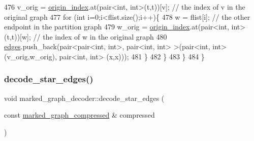 \begin{DoxyCode}
476       v\_orig = \hyperlink{classmarked__graph__decoder_aab3e2f6d4376ba96da32f25aa9ddd069}{origin\_index}.at(pair<int, int>(t,t))[v]; \textcolor{comment}{// the index of v in the original graph
       }
477       \textcolor{keywordflow}{for} (\textcolor{keywordtype}{int} i=0;i<flist.size();i++)\{
478         w = flist[i]; \textcolor{comment}{// the other endpoint in the partition graph}
479         w\_orig = \hyperlink{classmarked__graph__decoder_aab3e2f6d4376ba96da32f25aa9ddd069}{origin\_index}.at(pair<int, int>(t,t))[w]; \textcolor{comment}{// the index of w in the original
       graph}
480         \hyperlink{classmarked__graph__decoder_af9e75da0a495d9c3bdcd169e15e3261e}{edges}.push\_back(pair<pair<int, int>, pair<int, int> >(pair<int, int>(v\_orig,w\_orig), pair<int,
       int> (x,x)));
481       \}
482     \}
483   \}
484 \}
\end{DoxyCode}
\mbox{\label{classmarked__graph__decoder_a79fcfb8d5616c691114ebc0a7adb18b2}} 
\subsubsection{\texorpdfstring{decode\+\_\+star\+\_\+edges()}{decode\_star\_edges()}}
{\footnotesize\ttfamily void marked\+\_\+graph\+\_\+decoder\+::decode\+\_\+star\+\_\+edges (\begin{DoxyParamCaption}\item[{const \hyperlink{classmarked__graph__compressed}{marked\+\_\+graph\+\_\+compressed} \&}]{compressed }\end{DoxyParamCaption})\hspace{0.3cm}{\ttfamily [private]}}


